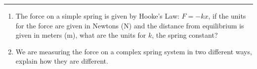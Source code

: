\documentclass[11pt]{article}
\begin{document}
\Large

\medskip\hrule\bigskip\bigskip
{}
\begin{enumerate}

\item The force on a simple spring is given by Hooke's Law: $F=-kx$, if the units for the force are given in Newtons (N) and the distance from equilibrium is given in meters (m), what are the units for $k$, the spring constant? 
  \vspace*{0.4\textheight}
\item We are measuring the force on a complex spring system in two different ways, explain how they are different.
  
\end{enumerate}
\end{document}
